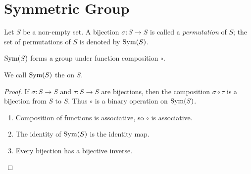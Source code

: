 \begin{comment}
\begin{proof}
If $G$ is simple, let $H_2=\{1\}$. Then we are done.

If $G$ is not simple, let $H_2$ be a maximal proper normal subgroup of $G$. We now claim that $G/H_2$ is simple.

If $G/H_2$ is not simple, it contains a proper non-trivial normal subgroup $L\triangleleft G/H_2$ such that $L\neq\{1\}$, $G/H2$. However, there is a correspondence between normal subgroups of $G/H_2$ and normal subgroups of $G$ containing $H_2$. So $L$ must be $K/H_2$ for some $K\triangleleft G$ such that $K\ge H_2$. Moreover, since $L$ is non-trivial and not $G/H_2$, we know $K$ is not $G$ or $H_2$. So $K$ is a larger normal subgroup. Contradiction.

So we have found an $H_2\triangleleft G$ such that $G/H_2$ is simple. Iterating this process on $H_2$ gives the desired result. Note that this process eventually stops, as $H_{i+1}<H_i$, and hence $|H_{i+1}|<|H_i|$, and all these numbers are finite.
\end{proof}
\end{comment}
\pagebreak

\section{Symmetric Group}
Let $S$ be a non-empty set. A bijection $\sigma\colon S\to S$ is called a \emph{permutation} of $S$; the set of permutations of $S$ is denoted by $\operatorname{Sym}(S)$.

\begin{lemma*}
$\operatorname{Sym}(S)$ forms a group under function composition $\circ$.
\end{lemma*}

We call $\operatorname{Sym}(S)$ the  on $S$.

\begin{proof}
If $\sigma\colon S\to S$ and $\tau\colon S\to S$ are bijections, then the composition $\sigma\circ\tau$ is a bijection from $S$ to $S$. Thus $\circ$ is a binary operation on $\operatorname{Sym}(S)$.
\begin{enumerate}[label=(\roman*)]
\item Composition of functions is associative, so $\circ$ is associative.
\item The identity of $\operatorname{Sym}(S)$ is the identity map.
\item Every bijection has a bijective inverse.
\end{enumerate}
\end{proof}

